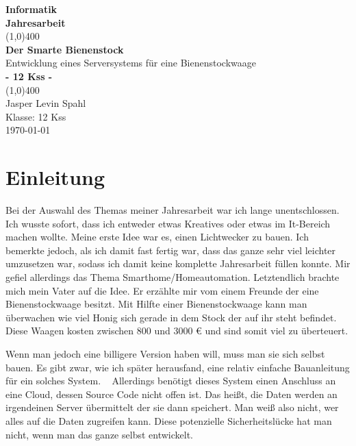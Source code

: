 \documentclass[a4paper, ngerman, 11pt]{scrartcl}
\author{Jasper Levin Spahl}
\begin{document}
\begin{titlepage}
\begin{center}
\vspace*{1cm}

\Large{\textbf{Informatik}}\\
\Large{\textbf{Jahresarbeit}}\\
\vfill
\line(1,0){400}\\[1mm]
\huge{\textbf{Der Smarte Bienenstock}}\\[3mm]
\large{Entwicklung eines Serversystems für eine Bienenstockwaage}\\[3mm]
\Large{\textbf{- 12 Kss -}}\\
\line(1,0){400}\\
\vfill
Jasper Levin Spahl\\
Klasse: 12 Kss\\
\today\\
\end{center}
\end{titlepage}

\setcounter{page}{1}
\tableofcontents
\listoffigures
\listoflistings{}
\clearpage

\section{Einleitung}

Bei der Auswahl des Themas meiner Jahresarbeit war ich lange unentschlossen.
Ich wusste sofort, dass ich entweder etwas Kreatives oder etwas im It-Bereich machen wollte.
Meine erste Idee war es, einen Lichtwecker zu bauen.
Ich bemerkte jedoch, als ich damit fast fertig war, dass das ganze sehr viel leichter umzusetzen war, sodass ich damit keine komplette Jahresarbeit füllen konnte.
Mir gefiel allerdings das Thema Smarthome/Homeautomation.
Letztendlich brachte mich mein Vater auf die Idee.
Er erzählte mir vom einem Freunde der eine Bienenstockwaage besitzt.
Mit Hilfte einer Bienenstockwaage kann man überwachen wie viel Honig sich gerade in dem Stock der auf ihr steht befindet.
Diese Waagen kosten zwischen 800 und 3000 \euro{} und sind somit viel zu überteuert.

Wenn man jedoch eine billigere Version haben will, muss man sie sich selbst bauen.
Es gibt zwar, wie ich später herausfand, eine relativ einfache Bauanleitung für ein solches System.
~\autocite{Honeypi}
Allerdings benötigt dieses System einen Anschluss an eine Cloud, dessen Source Code nicht offen ist.
Das heißt, die Daten werden an irgendeinen Server übermittelt der sie dann speichert.
Man weiß also nicht, wer alles auf die Daten zugreifen kann.
Diese potenzielle Sicherheitslücke hat man nicht, wenn man das ganze selbst entwickelt.
\end{document}
